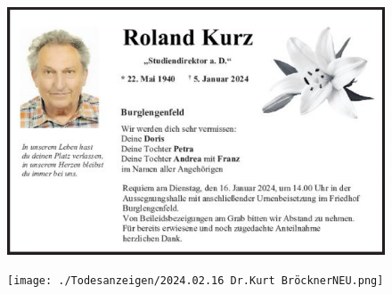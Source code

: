 \begin{figure}[h!]
	\begin{center}
		
		\vspace*{1cm}
		
	\end{center}
\end{figure}

\newpage
\begin{figure}[h!]
  \begin{center}
    
    \includegraphics[width=.9\linewidth]{./Todesanzeigen/2024.01.05 Kurz_Roland.png} 
    \vspace*{1cm}

  \end{center}
\end{figure}

\newpage
\begin{figure}[h!]
  \begin{center}
 \texttt{[image: ./Todesanzeigen/2024.02.16 Dr.Kurt BröcknerNEU.png]}
  \end{center}
\end{figure}

